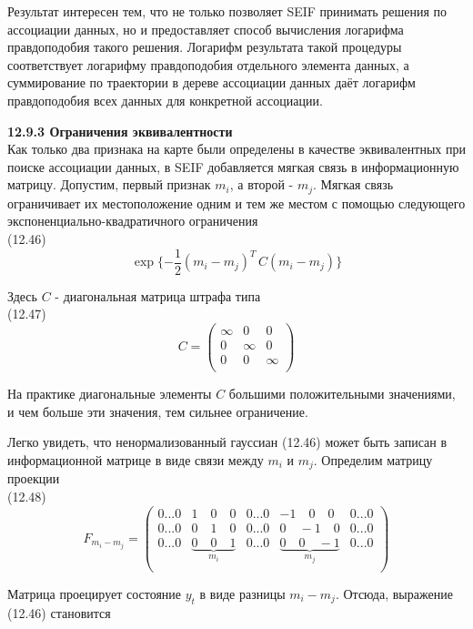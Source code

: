 \documentclass[10pt,a4paper]{article}
\begin{document}
Результат интересен тем, что не только позволяет SEIF принимать решения по ассоциации данных, но и предоставляет способ вычисления логарифма правдоподобия такого решения. Логарифм результата такой процедуры соответствует логарифму правдоподобия отдельного элемента данных, а суммирование по траектории в дереве ассоциации данных даёт логарифм правдоподобия всех данных для конкретной ассоциации.

\textbf{12.9.3	Ограничения эквивалентности}\\

Как только два признака на карте были определены в качестве эквивалентных при поиске ассоциации данных, в SEIF добавляется мягкая связь в информационную матрицу. Допустим, первый признак $m_i$, а второй - $m_j$. Мягкая связь ограничивает их местоположение одним и тем же местом с помощью следующего экспоненциально-квадратичного ограничения\\

(12.46)
$$\exp\{-\frac{1}{2}(m_i-m_j)^T\,C(m_i-m_j)\}$$

Здесь $C$ - диагональная матрица штрафа типа\\

(12.47)
$$C=\left(\begin{array}{ccc}
\infty&0&0\\
0&\infty&0\\
0&0&\infty\\
\end{array}\right)$$

На практике диагональные элементы $C$ большими положительными значениями, и чем больше эти значения, тем сильнее ограничение.

Легко увидеть, что ненормализованный гауссиан (12.46) может быть записан в информационной матрице в виде связи между $m_i$ и $m_j$. Определим матрицу проекции\\

(12.48)
$$F_{m_i-m_j}=\left(\begin{array}{ccccc}
0...0&1\quad0\quad0&0...0&-1\quad0\quad0&0...0\\
0...0&0\quad1\quad0&0...0&0\quad-1\quad0&0...0\\
0...0&\underbrace{0\quad0\quad1}_{m_i}&0...0&\underbrace{0\quad0\quad-1}_{m_j}&0...0\\
\end{array}\right)$$

Матрица проецирует состояние $y_t$ в виде разницы $m_i-m_j$. Отсюда, выражение (12.46) становится\\
\end{document}
